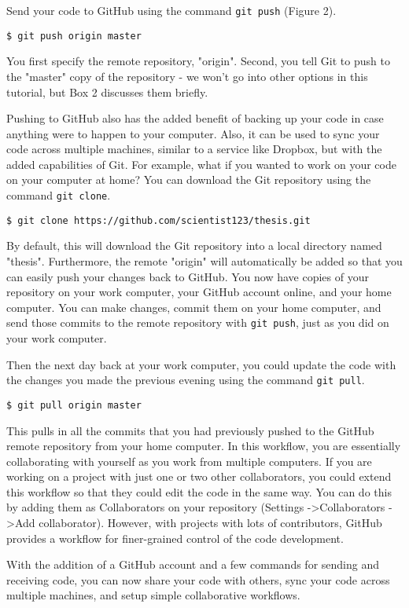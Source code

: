 Send your code to GitHub using the command \verb|git push| (Figure 2).

\begin{lstlisting}
$ git push origin master
\end{lstlisting}

You first specify the remote repository, "origin".
Second, you tell Git to push to the "master" copy of the repository - we won’t go into other options in this tutorial, but Box 2 discusses them briefly.

Pushing to GitHub also has the added benefit of backing up your code in case anything were to happen to your computer.
Also, it can be used to sync your code across multiple machines, similar to a service like Dropbox, but with the added capabilities of Git.
For example, what if you wanted to work on your code on your computer at home?
You can download the Git repository using the command \verb|git clone|.

\begin{lstlisting}
$ git clone https://github.com/scientist123/thesis.git
\end{lstlisting}

By default, this will download the Git repository into a local directory named "thesis".
Furthermore, the remote "origin" will automatically be added so that you can easily push your changes back to GitHub.
You now have copies of your repository on your work computer, your GitHub account online, and your home computer.
You can make changes, commit them on your home computer, and send those commits to the remote repository with \verb|git push|, just as you did on your work computer.

Then the next day back at your work computer, you could update the code with the changes you made the previous evening using the command \verb|git pull|.

\begin{lstlisting}
$ git pull origin master
\end{lstlisting}

This pulls in all the commits that you had previously pushed to the GitHub remote repository from your home computer.
In this workflow, you are essentially collaborating with yourself as you work from multiple computers.
If you are working on a project with just one or two other collaborators, you could extend this workflow so that they could edit the code in the same way.
You can do this by adding them as Collaborators on your repository (Settings -\textgreater Collaborators -\textgreater Add collaborator).
However, with projects with lots of contributors, GitHub provides a workflow for finer-grained control of the code development.

With the addition of a GitHub account and a few commands for sending and receiving code, you can now share your code with others, sync your code across multiple machines, and setup simple collaborative workflows.